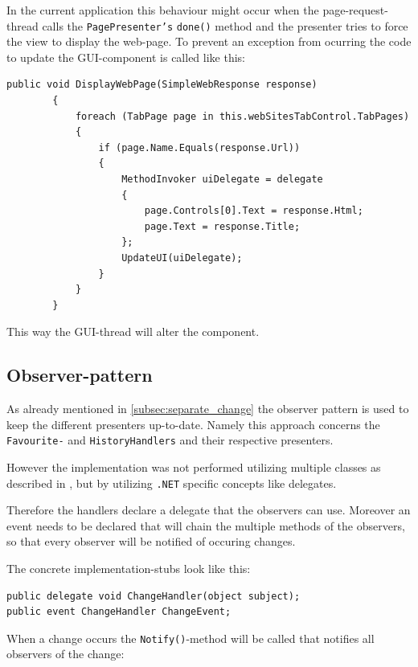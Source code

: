 In the current application this behaviour might occur when the page-request-thread calls the \texttt{PagePresenter's} \texttt{done()} method and the presenter tries to force the view to display the web-page.
To prevent an exception from ocurring the code to update the \ac{GUI}-component is called like this:

\begin{lstlisting}
public void DisplayWebPage(SimpleWebResponse response)
        {
            foreach (TabPage page in this.webSitesTabControl.TabPages)
            {
                if (page.Name.Equals(response.Url))
                {
                    MethodInvoker uiDelegate = delegate
                    {
                        page.Controls[0].Text = response.Html;
                        page.Text = response.Title;
                    };
                    UpdateUI(uiDelegate);
                }
            }
        }
\end{lstlisting}

This way the \ac{GUI}-thread will alter the component.

\subsection{Observer-pattern}

As already mentioned in \autoref{subsec:separate_change} the observer pattern is used to keep the different presenters up-to-date.
Namely this approach concerns the \texttt{Favourite-} and \texttt{HistoryHandlers} and their respective presenters.

However the implementation was not performed utilizing multiple classes as described in \textcite{gamma1994}, but by utilizing \texttt{.NET} specific concepts like delegates.

Therefore the handlers declare a delegate that the observers can use.
Moreover an event needs to be declared that will chain the multiple methods of the observers, so that every observer will be notified of occuring changes.

The concrete implementation-stubs look like this:

\begin{lstlisting}[caption=Declaration of delegate and event.]
public delegate void ChangeHandler(object subject);
public event ChangeHandler ChangeEvent;
\end{lstlisting}

When a change occurs the \texttt{Notify()}-method will be called that notifies all observers of the change:

